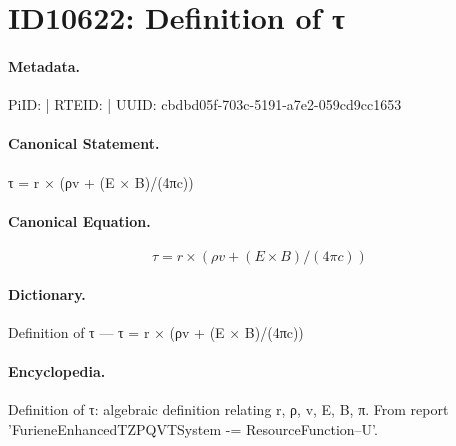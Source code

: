 \section*{ID10622: Definition of τ}
\paragraph{Metadata.}
PiID:  | RTEID:  | UUID: cbdbd05f-703c-5191-a7e2-059cd9cc1653

\paragraph{Canonical Statement.}
τ = r × (ρv + (E × B)/(4πc))

\paragraph{Canonical Equation.}
\[
τ = r × (ρv + (E × B)/(4πc))
\]

\paragraph{Dictionary.}
Definition of τ — τ = r × (ρv + (E × B)/(4πc))

\paragraph{Encyclopedia.}
Definition of τ: algebraic definition relating r, ρ, v, E, B, π. From report 'FurieneEnhancedTZPQVTSystem -= ResourceFunction--U'.
